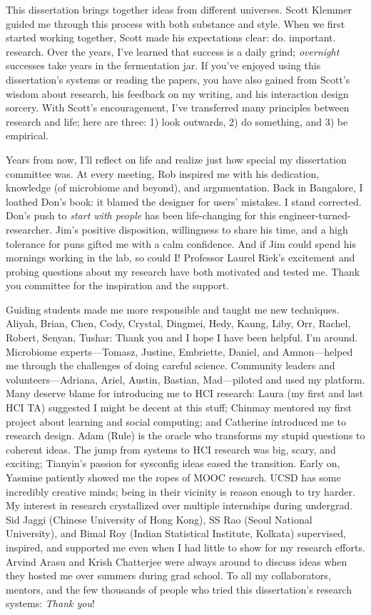 \begin{frontmatter}
\begin{acknowledgements}
This dissertation brings together ideas from different universes. Scott Klemmer guided me through this process with both substance and style. When we first started working together, Scott made his expectations clear: do. important. research. Over the years, I’ve learned that success is a daily grind; \textit{overnight} successes take years in the fermentation jar. If you’ve enjoyed using this dissertation’s systems or reading the papers, you have also gained from Scott’s wisdom about research, his feedback on my writing, and his interaction design sorcery. With Scott’s encouragement, I’ve transferred many principles between research and life; here are three: 1) look outwards, 2) do something, and 3) be empirical.

Years from now, I'll reflect on life and realize just how special my dissertation committee was. At every meeting, Rob inspired me with his dedication, knowledge (of microbiome and beyond), and argumentation. Back in Bangalore, I loathed Don’s book: it blamed the designer for users’ mistakes. I stand corrected. Don’s push to \textit{start with people} has been life-changing for this engineer-turned-researcher. Jim’s positive disposition, willingness to share his time, and a high tolerance for puns gifted me with a calm confidence. And if Jim could spend his mornings working in the lab, so could I! Professor Laurel Riek’s excitement and probing questions about my research have both motivated and tested me. Thank you committee for the inspiration and the support. 

Guiding students made me more responsible and taught me new techniques. Aliyah, Brian, Chen, Cody, Crystal, Dingmei, Hedy, Kaung, Liby, Orr, Rachel, Robert, Senyan, Tushar: Thank you and I hope I have been helpful. I’m around. Microbiome experts---Tomasz, Justine, Embriette, Daniel, and Amnon---helped me through the challenges of doing careful science. Community leaders and volunteers---Adriana, Ariel, Austin, Bastian, Mad---piloted and used my platform. Many deserve blame for introducing me to HCI research: Laura (my first and last HCI TA) suggested I might be decent at this stuff; Chinmay mentored my first project about learning and social computing; and Catherine introduced me to research design. Adam (Rule) is the oracle who transforms my stupid questions to coherent ideas. The jump from systems to HCI research was big, scary, and exciting; Tianyin’s passion for sysconfig ideas eased the transition. Early on, Yasmine patiently showed me the ropes of MOOC research. UCSD has some incredibly creative minds; being in their vicinity is reason enough to try harder. My interest in research crystallized over multiple internships during undergrad. Sid Jaggi (Chinese University of Hong Kong), SS Rao (Seoul National University), and Bimal Roy (Indian Statistical Institute, Kolkata) supervised, inspired, and supported me even when I had little to show for my research efforts.  Arvind Arasu and Krish Chatterjee were always around to discuss ideas when they hosted me over summers during grad school. To all my collaborators, mentors, and the few thousands of people who tried this dissertation's research systems: \textit{Thank you}! 


\end{acknowledgements}
\end{frontmatter}

